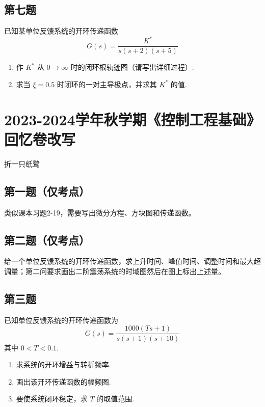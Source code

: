 \documentclass[UTF8]{ctexart}
\begin{document}
\subsection*{第七题}

已知某单位反馈系统的开环传递函数
\[
G(s)=\frac{K^*}{s(s+2)(s+5)}
\]

\begin{enumerate}
    \item[(1)] 作 $K^*$ 从 $0\rightarrow\infty$ 时的闭环根轨迹图（请写出详细过程）.
    \item[(2)] 求当 $\xi=0.5$ 时闭环的一对主导极点，并求其 $K^*$ 的值.
\end{enumerate}

\newpage
\section*{2023-2024学年秋学期《控制工程基础》回忆卷改写}

\begin{center}
    折一只纸鹭
\end{center}

\subsection*{第一题（仅考点）}

类似课本习题2-19，需要写出微分方程、方块图和传递函数。

\subsection*{第二题（仅考点）}

给一个单位反馈系统的开环传递函数，求上升时间、峰值时间、调整时间和最大超调量；第二问要求画出二阶震荡系统的时域图然后在图上标出上述量。

\subsection*{第三题}

已知单位反馈系统的开环传递函数为
\[
G(s)=\frac{1000(Ts+1)}{s(s+1)(s+10)}
\]
其中 $0<T<0.1$.

\begin{enumerate}
    \item[(1)] 求系统的开环增益与转折频率.
    \item[(2)] 画出该开环传递函数的幅频图.
    \item[(3)] 要使系统闭环稳定，求 $T$ 的取值范围.
\end{enumerate}
\end{document}
